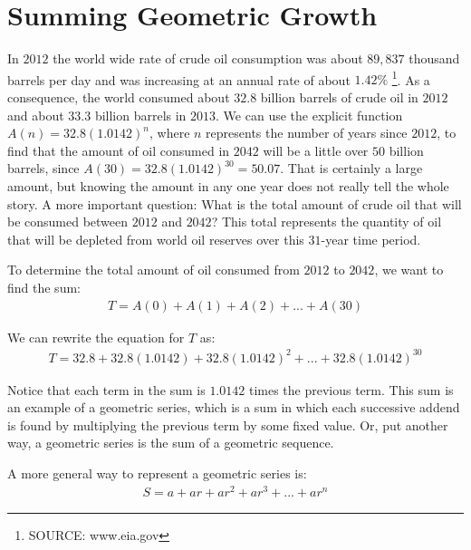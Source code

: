\documentclass[10pt,]{book}
\theoremstyle{plain}
\theoremstyle{definition}
\theoremstyle{definition}
\theoremstyle{definition}
\numberwithin{equation}{section}
\begin{document}
\typeout{************************************************}
\typeout{************************************************}
\section[{Summing Geometric Growth}]{Summing Geometric Growth}\label{chapter04-section04}
\hypertarget{p-137}{}%
In \(2012\) the world wide rate of crude oil consumption was about \(89,837\) thousand barrels per day and was increasing at an annual rate of about \(1.42\%\) \footnote{SOURCE: www.eia.gov\label{fn-1}}.  As a consequence, the world consumed about \(32.8\) billion barrels of crude oil in \(2012\) and about \(33.3\) billion barrels in \(2013\).  We can use the explicit function \(A(n)=32.8(1.0142)^n\), where \(n\) represents the number of years since \(2012\), to find that the amount of oil consumed in \(2042\) will be a little over \(50\) billion barrels, since \(A(30)=32.8(1.0142)^30 = 50.07\).  That is certainly a large amount, but knowing the amount in any one year does not really tell the whole story.  A more important question:  What is the total amount of crude oil that will be consumed between \(2012\) and \(2042\)?  This total represents the quantity of oil that will be depleted from world oil reserves over this \(31\)-year time period.%
\par
\hypertarget{p-138}{}%
To determine the total amount of oil consumed from \(2012\) to \(2042\), we want to find the sum:%
\begin{gather*}
T=A(0)+A(1)+A(2)+...+A(30)
\end{gather*}
%
\par
\hypertarget{p-139}{}%
We can rewrite the equation for \(T\) as:%
\begin{gather*}
T=32.8+32.8(1.0142)+32.8(1.0142)^2+...+32.8(1.0142)^{30}
\end{gather*}
%
\par
\hypertarget{p-140}{}%
Notice that each term in the sum is \(1.0142\) times the previous term. This sum is an example of a geometric series, which is a sum in which each successive addend is found by multiplying the previous term by some fixed value. Or, put another way, a geometric series is the sum of a geometric sequence.%
\par
\hypertarget{p-141}{}%
A more general way to represent a geometric series is:%
\begin{gather}
S = a + ar + ar^2 + ar^3 + ... + ar^n\label{chapter04-section04-geoseries-step1}
\end{gather}
\end{document}

